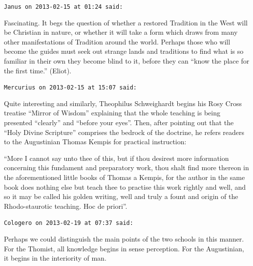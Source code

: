 \begin{footnotesize}
\begin{sffamily}
\texttt{Janus on 2013-02-15 at 01:24 said:}

Fascinating. It begs the question of whether a restored Tradition in the West will be Christian in nature, or whether it will take a form which draws from many other manifestations of Tradition around the world. Perhaps those who will become the guides must seek out strange lands and traditions to find what is so familiar in their own they become blind to it, before they can ``know the place for the first time.'' (Eliot).

\hfill

\texttt{Mercurius on 2013-02-15 at 15:07 said:}

Quite interesting and similarly, Theophilus Schweighardt begins his Rosy Cross treatise ``Mirror of Wisdom'' explaining that the whole teaching is being presented ``clearly'' and ``before your eyes''. Then, after pointing out that the ``Holy Divine Scripture'' comprises the bedrock of the doctrine, he refers readers to the Augustinian Thomas Kempis for practical instruction:

``More I cannot say unto thee of this, but if thou desirest more information concerning this fundament and preparatory work, thou shalt find more thereon in the aforementioned little books of Thomas a Kempis, for the author in the same book does nothing else but teach thee to practise this work rightly and well, and so it may be called his golden writing, well and truly a fount and origin of the Rhodo-staurotic teaching. Hoc de priori''.

\hfill

\texttt{Cologero on 2013-02-19 at 07:37 said:}

Perhaps we could distinguish the main points of the two schools in this manner. For the Thomist, all knowledge begins in sense perception. For the Augustinian, it begins in the interiority of man.


\hfill

\end{sffamily}
\end{footnotesize}

